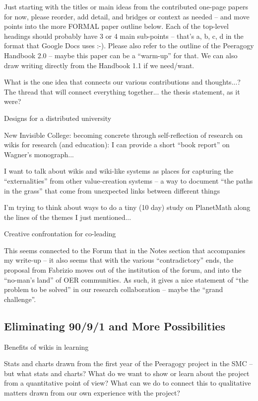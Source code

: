 \documentclass{acm_proc_article-sp}
\begin{document}
Just starting with the titles or main ideas from the contributed one-page papers for now, please reorder, add detail, and bridges or context as needed -- and move points into the more FORMAL paper outline below. Each of the top-level headings should probably have 3 or 4 main sub-points -- that's a, b, c, d in the format that Google Docs uses :-). Please also refer to the outline of the Peeragogy Handbook 2.0 -- maybe this paper can be a ``warm-up'' for that. We can also draw writing directly from the Handbook 1.1 if we need/want.

        What is the one idea that connects our various contributions and thoughts...? The thread that will connect everything together... the thesis statement, as it were?

    Designs for a distributed university

        New Invisible College: becoming concrete through self-reflection of research on wikis for research (and education): I can provide a short ``book report'' on Wagner's monograph...

        I want to talk about wikis and wiki-like systems as places for capturing the ``externalities'' from other value-creation systems -- a way to document ``the paths in the grass'' that come from unexpected links between different things

        I'm trying to think about ways to do a tiny (10 day) study on PlanetMath along the lines of the themes I just mentioned...

    Creative confrontation for co-leading

        This seems connected to the Forum that in the Notes section that accompanies my write-up -- it also seems that with the various ``contradictory'' ends, the proposal from Fabrizio moves out of the institution of the forum, and into the ``no-man's land'' of OER communities. As such, it gives a nice statement of ``the problem to be solved'' in our research collaboration -- maybe the ``grand challenge''.

\subsection{Eliminating 90/9/1 and More Possibilities}

    Benefits of wikis in learning

        Stats and charts drawn from the first year of the Peeragogy project in the SMC -- but what stats and charts? What do we want to show or learn about the project from a quantitative point of view? What can we do to connect this to qualitative matters drawn from our own experience with the project?
\end{document}
